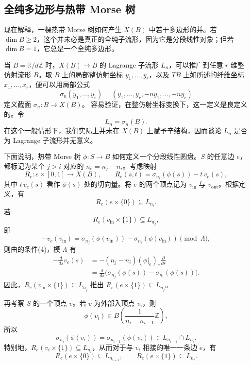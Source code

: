 \subsection{全纯多边形与热带 Morse 树}\label{sec:8.4.4}

现在解释，一棵热带 Morse 树如何产生 $X(B)$ 中若干多边形的并。若 $\dim B\geq2$，这个并未必是真正的全纯子流形，因为它是分段线性对象；但若 $\dim B=1$，它总是一个全纯多边形。

当 $B=\mathbb R/d\mathbb Z$ 时，$X(B)\to B$ 的 Lagrange 子流形 $L_n$，可以推广到任意 $r$ 维整仿射流形 $B$。取 $B$ 上的局部整仿射坐标 $y_1,\ldots,y_r$，以及 $TB$ 上如所述的纤维坐标 $x_1,\ldots,x_r$，便可以用局部公式
\[
\sigma_n(y_1,\ldots,y_r)=(y_1,\ldots,y_r,-ny_1,\ldots,-ny_r)
\]
定义截面 $\sigma_n\colon B\to X(B)$。
容易验证，在整仿射坐标变换下，这一定义是良定义的。令
\[
L_n=\sigma_n(B).
\]
在这个一般情形下，我们实际上并未在 $X(B)$ 上赋予辛结构，因而谈论 $L_n$ 是否为 Lagrange 子流形并无意义。

下面说明，热带 Morse 树 $\phi\colon S\to B$ 如何定义一个分段线性圆盘。$S$ 的任意边 $e$，都标记为某个 $j>i$ 对应的 $n_e=n_j-n_i$。考虑映射
\[
R_e\colon e\times[0,1]\longrightarrow X(B),
\qquad
R_e(s,t)=\sigma_{n_i}(\phi(s))-t\,v_e(s),
\]
其中 $t\,v_e(s)$ 看作 $\phi(s)$ 处的切向量。将 $e$ 的两个顶点记为 $v_{\mathrm{in}}$ 与 $v_{\mathrm{out}}$。根据定义，有
\[
R_e(e\times\{0\})\subseteq L_{n_i}.
\]
若
\[
R_e(v_{\mathrm{in}}\times\{1\})\subseteq L_{n_j},
\]
即
\[
-v_e(v_{\mathrm{in}})
=\sigma_{n_j}(\phi(v_{\mathrm{in}}))
-\sigma_{n_i}(\phi(v_{\mathrm{in}}))\pmod\Lambda,
\]
则由的条件(4)，模 $\Lambda$ 有
\[
\begin{aligned}
-\frac{d}{ds}v_e(s)
&=-(n_j-n_i)(\phi|_e)_*\frac\partial{\partial s}\\
&=\frac{d}{ds}\bigl(\sigma_{n_j}(\phi(s))-\sigma_{n_i}(\phi(s))\bigr).
\end{aligned}
\]
因此，$R_e(v_{\mathrm{in}}\times\{1\})\subseteq L_{n_j}$ 推出 $R_e(e\times\{1\})\subseteq L_{n_j}$。

再考察 $S$ 的一个顶点 $v$。若 $v$ 为外部入顶点 $v_i$，则
\[
\phi(v_i)\in B\left(\frac1{n_i-n_{i-1}}\mathbb Z\right),
\]
所以
\[
\sigma_{n_i}(\phi(v_i))=\sigma_{n_{i-1}}(\phi(v_i))
\in L_{n_{i-1}}\cap L_{n_i}.
\]
特别地，$R_e(v_i\times\{1\})\subseteq L_{n_i}$，从而对于与 $v_i$ 相接的唯一一条边 $e$，有
\[
R_e(e\times\{0\})\subseteq L_{n_{i-1}},
\qquad
R_e(e\times\{1\})\subseteq L_{n_i}.
\]

